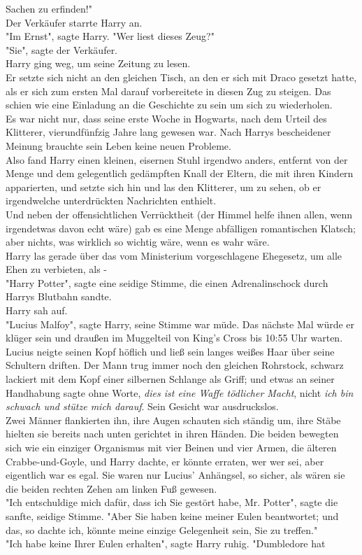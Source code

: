 {Sachen zu erfinden!"\\ Der Verkäufer starrte Harry an.\\ "Im Ernst", sagte Harry. "Wer liest dieses Zeug?"\\ "Sie", sagte der Verkäufer.\\ Harry ging weg, um seine Zeitung zu lesen.\\ Er setzte sich nicht an den gleichen Tisch, an den er sich mit Draco gesetzt hatte, als er sich zum ersten Mal darauf vorbereitete in diesen Zug zu steigen. Das schien wie eine Einladung an die Geschichte zu sein um sich zu wiederholen.\\ Es war nicht nur, dass seine erste Woche in Hogwarts, nach dem Urteil des Klitterer, vierundfünfzig Jahre lang gewesen war. Nach Harrys bescheidener Meinung brauchte sein Leben keine neuen Probleme.\\ Also fand Harry einen kleinen, eisernen Stuhl irgendwo anders, entfernt von der Menge und dem gelegentlich gedämpften Knall der Eltern, die mit ihren Kindern apparierten, und setzte sich hin und las den Klitterer, um zu sehen, ob er irgendwelche unterdrückten Nachrichten enthielt.\\ Und neben der offensichtlichen Verrücktheit (der Himmel helfe ihnen allen, wenn irgendetwas davon echt wäre) gab es eine Menge abfälligen romantischen Klatsch; aber nichts, was wirklich so wichtig wäre, wenn es wahr wäre.\\ Harry las gerade über das vom Ministerium vorgeschlagene Ehegesetz, um alle Ehen zu verbieten, als -\\ "Harry Potter", sagte eine seidige Stimme, die einen Adrenalinschock durch Harrys Blutbahn sandte.\\ Harry sah auf.\\ "Lucius Malfoy", sagte Harry, seine Stimme war müde. Das nächste Mal würde er klüger sein und draußen im Muggelteil von King's Cross bis 10:55 Uhr warten.\\ Lucius neigte seinen Kopf höflich und ließ sein langes weißes Haar über seine Schultern driften. Der Mann trug immer noch den gleichen Rohrstock, schwarz lackiert mit dem Kopf einer silbernen Schlange als Griff; und etwas an seiner Handhabung sagte ohne Worte, \emph{dies ist eine Waffe tödlicher Macht}, nicht \emph{ich bin schwach und stütze mich darauf}. Sein Gesicht war ausdruckslos.\\ Zwei Männer flankierten ihn, ihre Augen schauten sich ständig um, ihre Stäbe hielten sie bereits nach unten gerichtet in ihren Händen. Die beiden bewegten sich wie ein einziger Organismus mit vier Beinen und vier Armen, die älteren Crabbe-und-Goyle, und Harry dachte, er könnte erraten, wer wer sei, aber eigentlich war es egal. Sie waren nur Lucius' Anhängsel, so sicher, als wären sie die beiden rechten Zehen am linken Fuß gewesen.\\ "Ich entschuldige mich dafür, dass ich Sie gestört habe, Mr. Potter", sagte die sanfte, seidige Stimme. "Aber Sie haben keine meiner Eulen beantwortet; und das, so dachte ich, könnte meine einzige Gelegenheit sein, Sie zu treffen."\\ "Ich habe keine Ihrer Eulen erhalten", sagte Harry ruhig. "Dumbledore hat }
